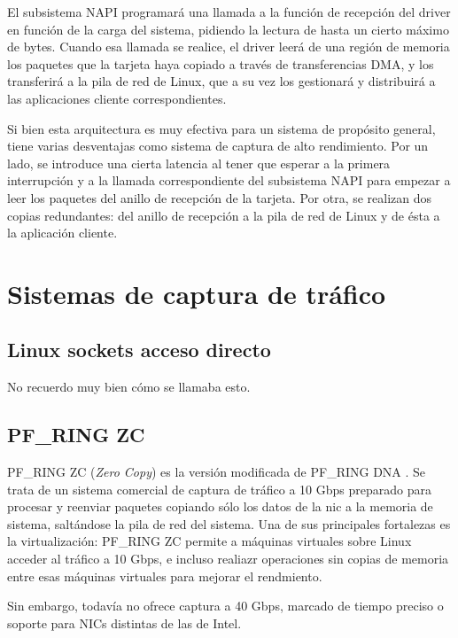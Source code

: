 \documentclass[oneside, draft]{epstfg}
\begin{document}
El subsistema \gls{NAPI} programará una llamada a la función de recepción del \gls{driver} en función de la carga del sistema, pidiendo la lectura de hasta un cierto máximo de bytes. Cuando esa llamada se realice, el \gls{driver} leerá de una región de memoria los paquetes que la tarjeta haya copiado a través de transferencias DMA, y los transferirá a la pila de red de Linux, que a su vez los gestionará y distribuirá a las aplicaciones cliente correspondientes.

Si bien esta arquitectura es muy efectiva para un sistema de propósito general, tiene varias desventajas como sistema de captura de alto rendimiento. Por un lado, se introduce una cierta latencia al tener que esperar a la primera interrupción y a la llamada correspondiente del subsistema NAPI para empezar a leer los paquetes del anillo de recepción de la tarjeta. Por otra, se realizan dos copias redundantes: del anillo de recepción a la pila de red de Linux y de ésta a la aplicación cliente.

\section{Sistemas de captura de tráfico}

\subsection{Linux sockets acceso directo}

No recuerdo muy bien cómo se llamaba esto. 

\subsection{PF\_RING ZC}

PF\_RING ZC (\textit{Zero Copy}) es la versión modificada de PF\_RING DNA \cite{rizzo201210}. Se trata de un sistema comercial de captura de tráfico a 10 Gbps preparado para procesar y reenviar paquetes copiando sólo los datos de la \gls{nic} a la memoria de sistema, saltándose la pila de red del sistema. Una de sus principales fortalezas es la virtualización: PF\_RING ZC permite a máquinas virtuales sobre Linux acceder al tráfico a 10 Gbps, e incluso realiazr operaciones sin copias de memoria entre esas máquinas virtuales para mejorar el rendmiento.

Sin embargo, todavía no ofrece captura a 40 Gbps, marcado de tiempo preciso o soporte para NICs distintas de las de Intel.
\end{document}

